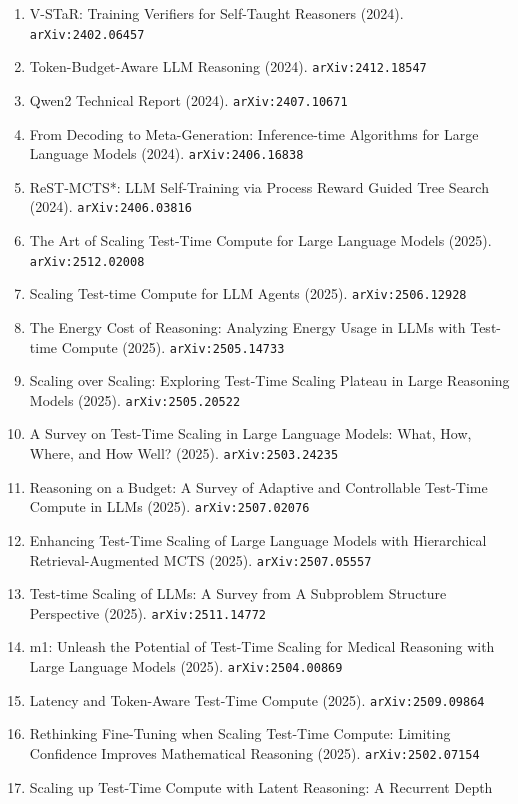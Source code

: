 \documentclass[11pt]{article}
\begin{document}
\begin{enumerate}
  Supervision (2024). \texttt{arXiv:2406.06592}
  \item V-STaR: Training Verifiers for Self-Taught Reasoners (2024). \texttt{arXiv:2402.06457}
  \item Token-Budget-Aware LLM Reasoning (2024). \texttt{arXiv:2412.18547}
  \item Qwen2 Technical Report (2024). \texttt{arXiv:2407.10671}
  \item From Decoding to Meta-Generation: Inference-time Algorithms for Large
  Language Models (2024). \texttt{arXiv:2406.16838}
  \item ReST-MCTS*: LLM Self-Training via Process Reward Guided Tree Search (2024). \texttt{arXiv:2406.03816}
  \item The Art of Scaling Test-Time Compute for Large Language Models (2025). \texttt{arXiv:2512.02008}
  \item Scaling Test-time Compute for LLM Agents (2025). \texttt{arXiv:2506.12928}
  \item The Energy Cost of Reasoning: Analyzing Energy Usage in LLMs with Test-time Compute (2025). \texttt{arXiv:2505.14733}
  \item Scaling over Scaling: Exploring Test-Time Scaling Plateau in Large Reasoning Models (2025). \texttt{arXiv:2505.20522}
  \item A Survey on Test-Time Scaling in Large Language Models: What, How,
  Where, and How Well? (2025). \texttt{arXiv:2503.24235}
  \item Reasoning on a Budget: A Survey of Adaptive and Controllable Test-Time Compute in LLMs (2025). \texttt{arXiv:2507.02076}
  \item Enhancing Test-Time Scaling of Large Language Models with Hierarchical Retrieval-Augmented MCTS (2025). \texttt{arXiv:2507.05557}
  \item Test-time Scaling of LLMs: A Survey from A Subproblem Structure Perspective (2025). \texttt{arXiv:2511.14772}
  \item m1: Unleash the Potential of Test-Time Scaling for Medical Reasoning with Large Language Models (2025). \texttt{arXiv:2504.00869}
  \item Latency and Token-Aware Test-Time Compute (2025). \texttt{arXiv:2509.09864}
  \item Rethinking Fine-Tuning when Scaling Test-Time Compute: Limiting Confidence Improves Mathematical Reasoning (2025). \texttt{arXiv:2502.07154}
  \item Scaling up Test-Time Compute with Latent Reasoning: A Recurrent Depth

\end{enumerate}
\end{document}
